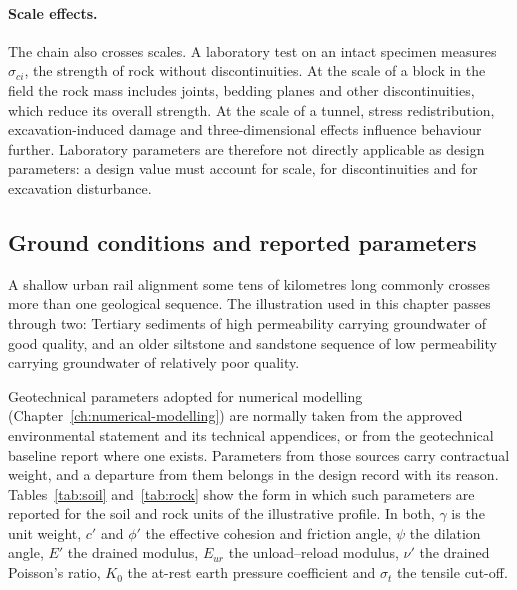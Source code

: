 \paragraph{Scale effects.}
The chain also crosses scales. A laboratory test on an intact specimen
measures \(\sigma_{ci}\), the strength of rock without discontinuities. At
the scale of a block in the field the rock mass includes joints, bedding
planes and other discontinuities, which reduce its overall strength. At the
scale of a tunnel, stress redistribution, excavation-induced damage and
three-dimensional effects influence behaviour further. Laboratory parameters
are therefore not directly applicable as design parameters: a design value
must account for scale, for discontinuities and for excavation disturbance.

\subsection{Ground conditions and reported parameters}
\label{sec:reported-parameters}

A shallow urban rail alignment some tens of kilometres long commonly crosses
more than one geological sequence. The illustration used in this chapter
passes through two: Tertiary sediments of high permeability carrying
groundwater of good quality, and an older siltstone and sandstone
sequence of low permeability carrying groundwater of relatively poor quality.

Geotechnical parameters adopted for numerical modelling
(Chapter~\ref{ch:numerical-modelling}) are normally taken from the approved
environmental statement and its technical appendices, or from the
geotechnical baseline report where one exists. Parameters from those sources
carry contractual weight, and a departure from them belongs in the design
record with its reason. Tables~\ref{tab:soil} and~\ref{tab:rock} show the
form in which such parameters are reported for the soil and rock units of the
illustrative profile. In both, \(\gamma\) is the unit weight, \(c'\) and
\(\phi'\) the effective cohesion and friction angle, \(\psi\) the dilation
angle, \(E'\) the drained modulus, \(E_{ur}\) the unload--reload modulus,
\(\nu'\) the drained Poisson's ratio, \(K_0\) the at-rest earth pressure
coefficient and \(\sigma_t\) the tensile cut-off.

